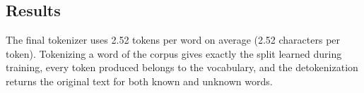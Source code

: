 \subsection*{Results}

The final tokenizer uses 2.52 tokens per word on average (2.52 characters per token).
Tokenizing a word of the corpus gives exactly the split learned during training, every
token produced belongs to the vocabulary, and the detokenization returns the original
text for both known and unknown words.



